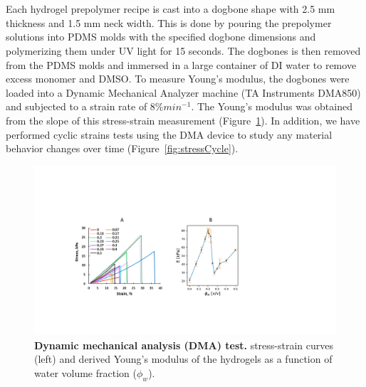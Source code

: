 \section{}
Each hydrogel prepolymer recipe is cast into a dogbone shape with 2.5 mm thickness and 1.5 mm neck width. This is done by pouring the prepolymer solutions into PDMS molds with the specified dogbone dimensions and polymerizing them under UV light for 15 seconds. The dogbones is then removed from the PDMS molds and immersed in a large container of DI water to remove excess monomer and DMSO. To measure Young’s modulus, the dogbones were loaded into a Dynamic Mechanical Analyzer machine (TA Instruments DMA850) and subjected to a strain rate of $8\% min^{-1}$. The Young’s modulus was obtained from the slope of this stress-strain measurement (Figure~\ref{fig:DMA}). In addition, we have performed cyclic strains tests using the DMA device to study any material behavior changes over time (Figure~\ref{fig:stressCycle}).

\begin{figure}[!th]
      \centering
      \includegraphics[width=\textwidth]{DMA.pdf}
      \caption[]{\textbf{Dynamic mechanical analysis (DMA) test.} stress-strain curves (left) and derived Young’s modulus of the hydrogels as a function of water volume fraction ($\phi_{w}$).}
      \label{fig:DMA}
\end{figure}

